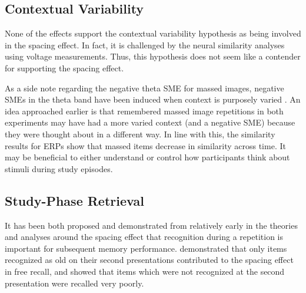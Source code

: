 \subsection{Contextual Variability}



None of the effects support the contextual variability hypothesis as being involved in the spacing effect.  In fact, it is challenged by the neural similarity analyses using voltage measurements.  Thus, this hypothesis does not seem like a contender for supporting the spacing effect.

As a side note regarding the negative theta SME for massed images, negative SMEs in the theta band have been induced when context is purposely varied \cite{StauHans2013}.  An idea approached earlier is that remembered massed image repetitions in both experiments may have had a more varied context (and a negative SME) because they were thought about in a different way.   In line with this, the similarity results for ERPs show that massed items decrease in similarity across time.  It may be beneficial to either understand or control how participants think about stimuli during study episodes.



\subsection{Study-Phase Retrieval}


It has been both proposed and demonstrated from relatively early in the theories and analyses around the spacing effect that recognition during a repetition is important for subsequent memory performance.   demonstrated that only items recognized as old on their second presentations contributed to the spacing effect in free recall, and  showed that items which were not recognized at the second presentation were recalled very poorly.

